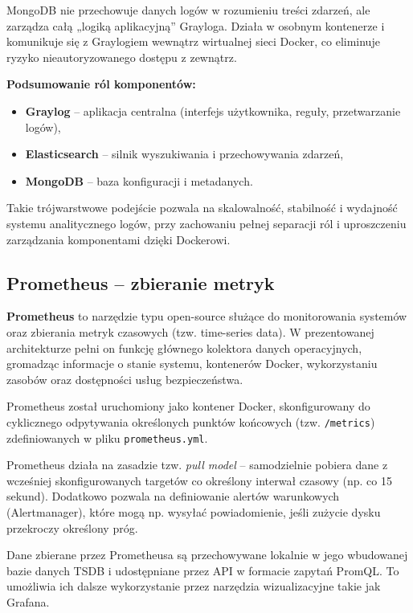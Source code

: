 \documentclass[
    left=2.5cm,         %
    right=2.5cm,        %
    top=2.5cm,          %
    bottom=3cm,         %
    bindingoffset=6mm,  %
    nohyphenation=true %
]{eiti/eiti-thesis} %
\begin{document}
MongoDB nie przechowuje danych logów w rozumieniu treści zdarzeń, ale zarządza całą „logiką aplikacyjną” Grayloga. Działa w osobnym kontenerze i komunikuje się z Graylogiem wewnątrz wirtualnej sieci Docker, co eliminuje ryzyko nieautoryzowanego dostępu z zewnątrz.

\textbf{Podsumowanie ról komponentów:}
\begin{itemize}
    \item \textbf{Graylog} – aplikacja centralna (interfejs użytkownika, reguły, przetwarzanie logów),
    \item \textbf{Elasticsearch} – silnik wyszukiwania i przechowywania zdarzeń,
    \item \textbf{MongoDB} – baza konfiguracji i metadanych.
\end{itemize}

Takie trójwarstwowe podejście pozwala na skalowalność, stabilność i wydajność systemu analitycznego logów, przy zachowaniu pełnej separacji ról i uproszczeniu zarządzania komponentami dzięki Dockerowi.

\subsection{Prometheus – zbieranie metryk}

\textbf{Prometheus}\cite{prometheus-docs} to narzędzie typu open-source służące do monitorowania systemów oraz zbierania metryk czasowych (tzw. time-series data). W prezentowanej architekturze pełni on funkcję głównego kolektora danych operacyjnych, gromadząc informacje o stanie systemu, kontenerów Docker, wykorzystaniu zasobów oraz dostępności usług bezpieczeństwa.

Prometheus został uruchomiony jako kontener Docker, skonfigurowany do cyklicznego odpytywania określonych punktów końcowych (tzw. \texttt{/metrics}) zdefiniowanych w pliku \texttt{prometheus.yml}\cite{config-prometheus}. 

Prometheus działa na zasadzie tzw. \textit{pull model} – samodzielnie pobiera dane z wcześniej skonfigurowanych targetów co określony interwał czasowy (np. co 15 sekund). Dodatkowo pozwala na definiowanie alertów warunkowych (Alertmanager), które mogą np. wysyłać powiadomienie, jeśli zużycie dysku przekroczy określony próg.

Dane zbierane przez Prometheusa są przechowywane lokalnie w jego wbudowanej bazie danych TSDB i udostępniane przez API w formacie zapytań PromQL. To umożliwia ich dalsze wykorzystanie przez narzędzia wizualizacyjne takie jak Grafana.
\end{document}
